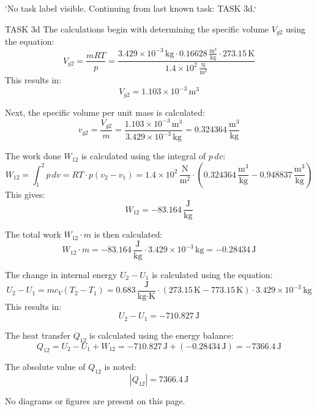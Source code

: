 `No task label visible. Continuing from last known task: TASK 3d.`

TASK 3d  
The calculations begin with determining the specific volume \( V_{g2} \) using the equation:  
\[
V_{g2} = \frac{mRT}{p} = \frac{3.429 \times 10^{-3} \, \text{kg} \cdot 0.16628 \, \frac{\text{m}^3}{\text{kg}} \cdot 273.15 \, \text{K}}{1.4 \times 10^2 \, \frac{\text{N}}{\text{m}^2}}
\]  
This results in:  
\[
V_{g2} = 1.103 \times 10^{-3} \, \text{m}^3
\]  

Next, the specific volume per unit mass is calculated:  
\[
v_{g2} = \frac{V_{g2}}{m} = \frac{1.103 \times 10^{-3} \, \text{m}^3}{3.429 \times 10^{-3} \, \text{kg}} = 0.324364 \, \frac{\text{m}^3}{\text{kg}}
\]  

The work done \( W_{12} \) is calculated using the integral of \( p \, dv \):  
\[
W_{12} = \int_{1}^{2} p \, dv = R T \cdot p (v_2 - v_1) = 1.4 \times 10^2 \, \frac{\text{N}}{\text{m}^2} \cdot (0.324364 \, \frac{\text{m}^3}{\text{kg}} - 0.948837 \, \frac{\text{m}^3}{\text{kg}})
\]  
This gives:  
\[
W_{12} = -83.164 \, \frac{\text{J}}{\text{kg}}
\]  

The total work \( W_{12} \cdot m \) is then calculated:  
\[
W_{12} \cdot m = -83.164 \, \frac{\text{J}}{\text{kg}} \cdot 3.429 \times 10^{-3} \, \text{kg} = -0.28434 \, \text{J}
\]  

The change in internal energy \( U_2 - U_1 \) is calculated using the equation:  
\[
U_2 - U_1 = m c_V (T_2 - T_1) = 0.683 \, \frac{\text{J}}{\text{kg·K}} \cdot (273.15 \, \text{K} - 773.15 \, \text{K}) \cdot 3.429 \times 10^{-3} \, \text{kg}
\]  
This results in:  
\[
U_2 - U_1 = -710.827 \, \text{J}
\]  

The heat transfer \( Q_{12} \) is calculated using the energy balance:  
\[
Q_{12} = U_2 - U_1 + W_{12} = -710.827 \, \text{J} + (-0.28434 \, \text{J}) = -7366.4 \, \text{J}
\]  

The absolute value of \( Q_{12} \) is noted:  
\[
|Q_{12}| = 7366.4 \, \text{J}
\]  

No diagrams or figures are present on this page.